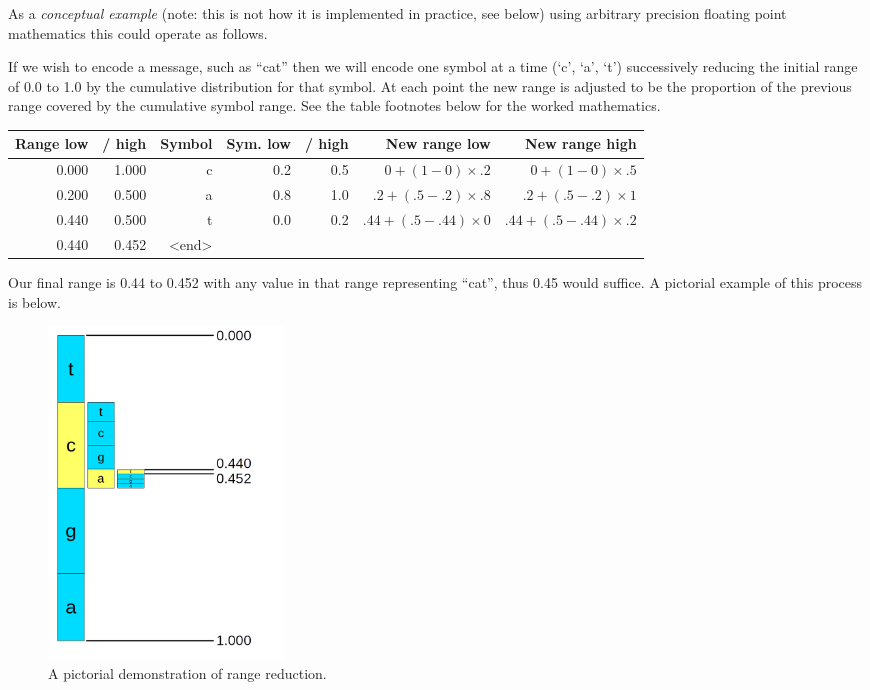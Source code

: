 \documentclass[a4paper]{article}
\begin{document}
As a \emph{conceptual example} (note: this is not how it is implemented in practice, see below) using arbitrary precision floating point mathematics this could operate as follows.

If we wish to encode a message, such as ``cat'' then we will encode
one symbol at a time (`c', `a', `t') successively reducing the
initial range of 0.0 to 1.0 by the cumulative distribution for that
symbol.  At each point the new range is adjusted to be the proportion
of the previous range covered by the cumulative symbol range.  See the
table footnotes below for the worked mathematics.

\begin{threeparttable}[t]
\begin{tabular}{rrrrrrr}
\hline
\textbf{Range low} & \textbf{/ high} & \textbf{Symbol} & \textbf{Sym. low} & \textbf{/ high} & \textbf{New range low} & \textbf{New range high}\\
\hline
0.000 & 1.000 & c & 0.2 & 0.5 & $0+(1-0)\times.2$ & $0+(1-0)\times.5$\\
0.200 & 0.500 & a & 0.8 & 1.0 & $.2+(.5-.2)\times.8$& $.2+(.5-.2)\times 1$\\
0.440 & 0.500 & t & 0.0 & 0.2 & $.44+(.5-.44)\times 0$ & $.44+(.5-.44)\times .2$\\
0.440 & 0.452 & <end>\\
\hline
\end{tabular}
\end{threeparttable}

Our final range is 0.44 to 0.452 with any value in that range representing
``cat'', thus 0.45 would suffice.  A pictorial example of this process is below.

\begin{figure}[h]
\includegraphics[height=250pt, keepaspectratio=true]{img/range_code.png}
\caption{A pictorial demonstration of range reduction.}
\end{figure}
\end{document}
